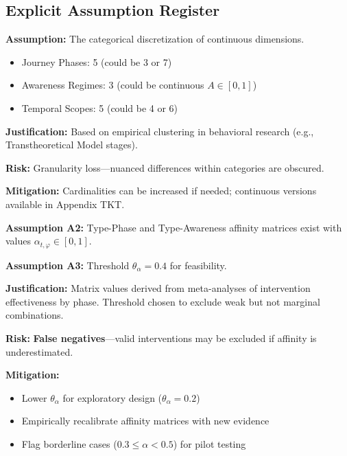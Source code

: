 \subsection{Explicit Assumption Register}

\begin{tcolorbox}[colback=yellow!5!white, colframe=yellow!75!black,
    title=\textbf{Assumption A1: Dimension Cardinalities}]
\textbf{Assumption:} The categorical discretization of continuous dimensions.

\begin{itemize}[nosep]
\item Journey Phases: 5 (could be 3 or 7)
\item Awareness Regimes: 3 (could be continuous $A \in [0,1]$)
\item Temporal Scopes: 5 (could be 4 or 6)
\end{itemize}

\textbf{Justification:} Based on empirical clustering in behavioral research (e.g., Transtheoretical Model stages).

\textbf{Risk:} Granularity loss---nuanced differences within categories are obscured.

\textbf{Mitigation:} Cardinalities can be increased if needed; continuous versions available in Appendix TKT.
\end{tcolorbox}

\begin{tcolorbox}[colback=yellow!5!white, colframe=yellow!75!black,
    title=\textbf{Assumptions A2--A3: Affinity Constraints}]
\textbf{Assumption A2:} Type-Phase and Type-Awareness affinity matrices exist with values $\alpha_{t,\varphi} \in [0,1]$.

\textbf{Assumption A3:} Threshold $\theta_\alpha = 0.4$ for feasibility.

\textbf{Justification:} Matrix values derived from meta-analyses of intervention effectiveness by phase. Threshold chosen to exclude weak but not marginal combinations.

\textbf{Risk:} \textbf{False negatives}---valid interventions may be excluded if affinity is underestimated.

\textbf{Mitigation:}
\begin{itemize}[nosep]
\item Lower $\theta_\alpha$ for exploratory design ($\theta_\alpha = 0.2$)
\item Empirically recalibrate affinity matrices with new evidence
\item Flag borderline cases ($0.3 \leq \alpha < 0.5$) for pilot testing
\end{itemize}
\end{tcolorbox}

